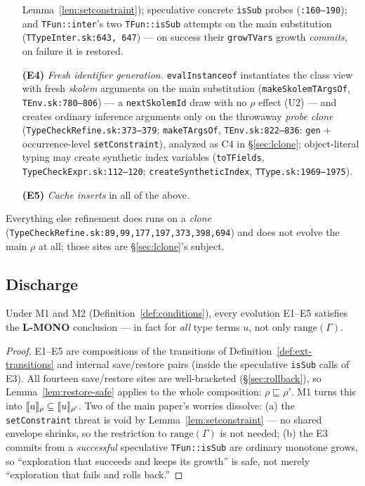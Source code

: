 \documentclass[11pt]{article}
\newcommand{\Env}{\Gamma}
\newcommand{\stle}{\sqsubseteq}              %
\begin{document}
\begin{itemize}
  Lemma~\ref{lem:setconstraint}); speculative concrete
  \texttt{isSub} probes (\texttt{:160--190}); and
  \texttt{TFun::inter}'s two \texttt{TFun::isSub} attempts on the main
  substitution (\texttt{TTypeInter.sk:643, 647}) — on success their
  \texttt{growTVars} growth \emph{commits}, on failure it is restored.
\item[\textbf{(E4)}] \emph{Fresh identifier generation.}
  \texttt{evalInstanceof} instantiates the class view with fresh
  \emph{skolem} arguments on the main substitution
  (\texttt{makeSkolemTArgsOf}, \texttt{TEnv.sk:780--806}) — a
  \texttt{nextSkolemId} draw with no $\rho$ effect (U2) — and creates
  ordinary inference arguments only on the throwaway \emph{probe clone}
  (\texttt{TypeCheckRefine.sk:373--379}; \texttt{makeTArgsOf},
  \texttt{TEnv.sk:822--836}: \texttt{gen} + occurrence-level
  \texttt{setConstraint}), analyzed as C4 in \S\ref{sec:lclone};
  object-literal typing may create synthetic index
  variables (\texttt{toTFields}, \texttt{TypeCheckExpr.sk:112--120};
  \texttt{createSyntheticIndex}, \texttt{TType.sk:1969--1975}).
\item[\textbf{(E5)}] \emph{Cache inserts} in all of the above.
\end{itemize}

Everything else refinement does runs on a \emph{clone}
(\texttt{TypeCheckRefine.sk:89,99,177,197,373,398,694}) and does not
evolve the
main $\rho$ at all; those sites are \S\ref{sec:lclone}'s subject.

\subsection{Discharge}

\begin{theorem}[L-MONO]
\label{thm:lmono}
Under M1 and M2 (Definition~\ref{def:conditions}), every evolution E1--E5
satisfies the \textbf{L-MONO} conclusion — in fact for \emph{all} type
terms $u$, not only $\mathrm{range}(\Env)$.
\end{theorem}
\begin{proof}
E1--E5 are compositions of the transitions of
Definition~\ref{def:ext-transitions} and internal save/restore pairs
(inside the speculative \texttt{isSub} calls of E3). All fourteen
save/restore sites are well-bracketed (\S\ref{sec:rollback}), so
Lemma~\ref{lem:restore-safe} applies to the whole composition:
$\rho \stle \rho'$. M1 turns this into
$\llbracket u \rrbracket_\rho \subseteq \llbracket u \rrbracket_{\rho'}$.
Two of the main paper's worries dissolve: (a) the
\texttt{setConstraint} threat is void by Lemma~\ref{lem:setconstraint} —
no shared envelope shrinks, so the restriction to
$\mathrm{range}(\Env)$ is not needed; (b) the E3 commits from a
\emph{successful} speculative \texttt{TFun::isSub} are ordinary monotone
grows, so ``exploration that succeeds and keeps its growth'' is safe,
not merely ``exploration that fails and rolls back.''
\end{proof}
\end{document}
